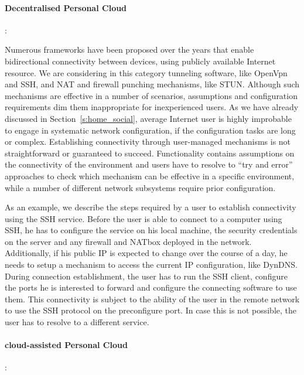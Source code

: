 \paragraph*{Decentralised Personal Cloud}: 

Numerous frameworks have been proposed over the years that enable bidirectional
connectivity between devices, using publicly available Internet resource. We are
considering in this category tunneling software, like OpenVpn and SSH, and NAT
and firewall punching mechanisms, like STUN. Although such mechanisms are
effective in a number of scenarios, assumptions and configuration requirements
dim them inappropriate for inexperienced users. As we have already discussed in
Section~\ref{s:home_social}, average Internet user is highly improbable to
engage in systematic network configuration, if the configuration tasks are long
or complex. Establishing connectivity through user-managed mechanisms is not
straightforward or guaranteed to succeed. Functionality contains assumptions on
the connectivity of the environment and users have to resolve to ``try and
error'' approaches to check which mechanism can be effective in a specific
environment, while a number of different network subsystems require prior
configuration. 

As an example, we describe the steps required by a user to establish
connectivity using the SSH service. Before the user is able to connect to a
computer using SSH, he has to configure the service on his local machine, the
security credentials on the server and any firewall and NATbox deployed in the
network. Additionally, if his public IP is expected to change over the course of
a day, he needs to setup a mechanism to access the current IP configuration,
like DynDNS.  During connection establishment, the user has to run the SSH
client, configure the ports he is interested to forward and configure the
connecting software to use them.  This connectivity is subject to the ability of
the user in the remote network to use the SSH protocol on the preconfigure port.
In case this is not possible, the user has to resolve to a different service.

\paragraph*{cloud-assisted Personal Cloud}:

